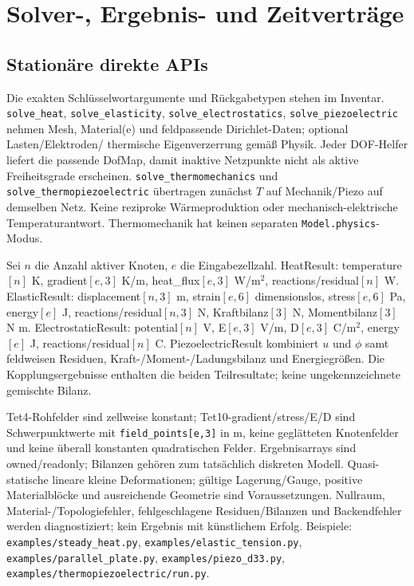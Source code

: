 \chapter{Solver-, Ergebnis- und Zeitverträge}
\label{api:solvers}
\begingroup\raggedright
\section{Stationäre direkte APIs}
Die exakten Schlüsselwortargumente und Rückgabetypen stehen im Inventar.
\texttt{solve\_heat}, \texttt{solve\_elasticity},
\texttt{solve\_electrostatics}, \texttt{solve\_piezoelectric} nehmen Mesh,
Material(e) und feldpassende Dirichlet-Daten; optional Lasten/Elektroden/
thermische Eigenverzerrung gemäß Physik. Jeder DOF-Helfer liefert die passende
DofMap, damit inaktive Netzpunkte nicht als aktive Freiheitsgrade erscheinen.
\texttt{solve\_thermomechanics} und \texttt{solve\_thermopiezoelectric}
übertragen zunächst $T$ auf Mechanik/Piezo auf demselben Netz. Keine
reziproke Wärmeproduktion oder mechanisch-elektrische Temperaturantwort.
Thermomechanik hat keinen separaten \texttt{Model.physics}-Modus.

Sei $n$ die Anzahl aktiver Knoten, $e$ die Eingabezellzahl.
HeatResult: temperature$[n]$ K, gradient$[e,3]$ K/m, heat\_flux$[e,3]$ W/m$^2$,
reactions/residual$[n]$ W. ElasticResult: displacement$[n,3]$ m,
strain$[e,6]$ dimensionslos, stress$[e,6]$ Pa, energy$[e]$ J,
reactions/residual$[n,3]$ N, Kraftbilanz$[3]$ N, Momentbilanz$[3]$ N m.
ElectrostaticResult: potential$[n]$ V, E$[e,3]$ V/m, D$[e,3]$ C/m$^2$,
energy$[e]$ J, reactions/residual$[n]$ C. PiezoelectricResult kombiniert $u$
und $\phi$ samt feldweisen Residuen, Kraft-/Moment-/Ladungsbilanz und
Energiegrößen. Die Kopplungsergebnisse enthalten die beiden Teilresultate;
keine ungekennzeichnete gemischte Bilanz.

Tet4-Rohfelder sind zellweise konstant; Tet10-gradient/stress/E/D sind
Schwerpunktwerte mit \texttt{field\_points[e,3]} in m, keine geglätteten
Knotenfelder und keine überall konstanten quadratischen Felder. Ergebnisarrays
sind owned/readonly; Bilanzen gehören zum tatsächlich diskreten Modell.
Quasi-statische lineare kleine Deformationen; gültige Lagerung/Gauge,
positive Materialblöcke und ausreichende Geometrie sind Voraussetzungen.
Nullraum, Material-/Topologiefehler, fehlgeschlagene Residuen/Bilanzen und
Backendfehler werden diagnostiziert; kein Ergebnis mit künstlichem Erfolg.
Beispiele: \nolinkurl{examples/steady_heat.py},
\nolinkurl{examples/elastic_tension.py}, \nolinkurl{examples/parallel_plate.py},
\nolinkurl{examples/piezo_d33.py}, \nolinkurl{examples/thermopiezoelectric/run.py}.

